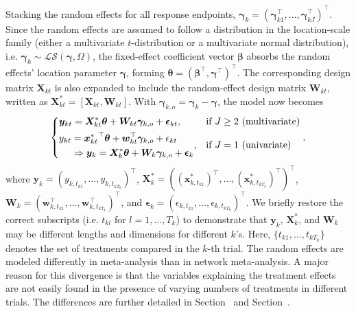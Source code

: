 Stacking the random effects for all response endpoints, $\boldsymbol{\gamma}_k = (\boldsymbol{\gamma}_{k1}^\top, \ldots, \boldsymbol{\gamma}_{kJ}^\top)^\top$. Since the random effects are assumed to follow a distribution in the location-scale family (either a multivariate $t$-distribution or a multivariate normal distribution), i.e. $\boldsymbol{\gamma}_k \sim \mathcal{LS}(\boldsymbol{\gamma}, \Omega)$, the fixed-effect coefficient vector $\boldsymbol{\beta}$ absorbs the random effects' location parameter $\boldsymbol{\gamma}$, forming $\boldsymbol{\theta} = (\boldsymbol{\beta}^\top,\boldsymbol{\gamma}^\top)^\top$. The corresponding design matrix $\boldsymbol{X}_{kt}$ is also expanded to include the random-effect design matrix $\boldsymbol{W}_{kt}$, written as $\boldsymbol{X}_{kt}^* = [\boldsymbol{X}_{kt}, \boldsymbol{W}_{kt}]$. With $\boldsymbol{\gamma}_{k,o} = \boldsymbol{\gamma}_k - \boldsymbol{\gamma}$, the model now becomes
\begin{equation}\label{eq:model-centered}
  \begin{dcases}
    \bm{y}_{kt} = \bm{X}_{kt}^*\bm{\theta} + \bm{W}_{kt} \bm{\gamma}_{k,o} + \bm{\epsilon}_{kt},&\text{if $J\geq 2$ (multivariate)}\\
  \begin{split}
  y_{kt} &= {\bm{x}_{kt}^*}^\top\bm{\theta} + \bm{w}_{kt}^\top \bm{\gamma}_{k,o} + \epsilon_{kt}\\
    &\Rightarrow \boldsymbol{y}_k = \boldsymbol{X}_k^* \boldsymbol{\theta} + \boldsymbol{W}_k \boldsymbol{\gamma}_{k,o} + \boldsymbol{\epsilon}_k
  \end{split}
  ,&\text{if $J=1$ (univariate)}
  \end{dcases},
\end{equation}
where $\boldsymbol{y}_k=(y_{k,t_{k1}},\ldots,y_{k,t_{kT_k}})^\top$, $\boldsymbol{X}_k^*= ((\boldsymbol{x}^*_{k,t_{k1}})^\top,\ldots,(\boldsymbol{x}^*_{k,t_{kT_k}})^\top)^\top$, $\boldsymbol{W}_k = (\boldsymbol{w}_{k,t_{k1}}^\top,\ldots,\boldsymbol{w}_{k,t_{kT_k}}^\top)^\top$, and $\boldsymbol{\epsilon}_k=(\epsilon_{k,t_{k1}},\ldots,\epsilon_{k,t_{kT_k}})^\top$. We briefly restore the correct subscripts (i.e. $t_{kl}$ for $l=1,\ldots,T_k$) to demonstrate that $\boldsymbol{y}_k$, $\boldsymbol{X}_k^*$, and $\boldsymbol{W}_k$ may be different lengths and dimensions for different $k$'s. {\color{black}Here, $\{t_{k1},\ldots,t_{kT_k}\}$ denotes the set of treatments compared in the $k$-th trial.} The random effects are modeled differently in meta-analysis than in network meta-analysis. A major reason for this divergence is that the variables explaining the treatment effects are not easily found in the presence of varying numbers of treatments in different trials. The differences are further detailed in Section~ and Section~.


